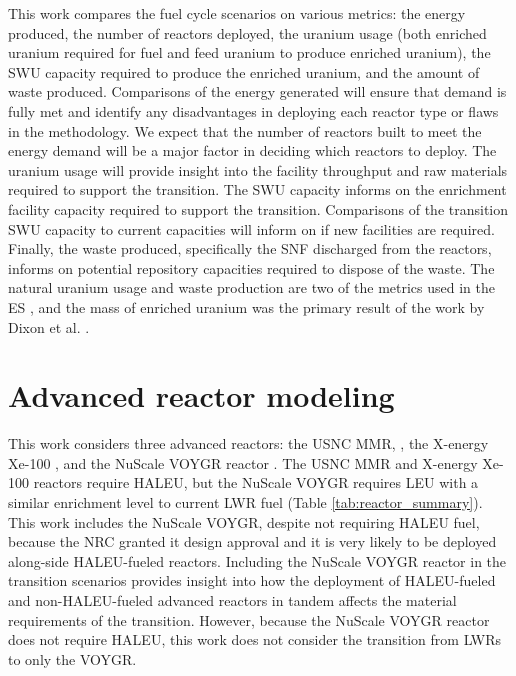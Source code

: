 This work compares the fuel cycle scenarios on various metrics: 
the energy produced, the number of reactors deployed, the 
uranium usage (both enriched uranium required for fuel and feed uranium 
to produce enriched uranium), 
the \gls{SWU} capacity required to produce the enriched uranium, and the 
amount of waste produced. Comparisons of the energy generated will ensure 
that demand is fully met and identify any disadvantages in deploying each 
reactor type or flaws in the methodology. We expect that the number of 
reactors built to meet the energy demand will be a major factor in deciding 
which reactors to deploy. The uranium usage will provide insight into 
the facility throughput and raw materials required to support the 
transition. The \gls{SWU} capacity informs on the enrichment facility 
capacity required to support the transition. Comparisons of the transition 
\gls{SWU} capacity to current capacities will inform on if new facilities 
are required. Finally, the waste produced, specifically the \gls{SNF} 
discharged from the reactors, informs on potential repository capacities 
required to dispose of the waste. The natural 
uranium usage and waste production are two of the metrics used in the \gls{ES} 
\cite{wigeland_nuclear_2014}, and the mass of enriched uranium was the 
primary result of the work by Dixon et al. \cite{dixon_estimated_2022}.

\section{Advanced reactor modeling} \label{sec:reactor_methods}
This work considers three advanced reactors: the \gls{USNC} \gls{MMR}, 
\cite{noauthor_usnc_2021}, the X-energy Xe-100 
\cite{mulder_overview_2021}, and 
the NuScale VOYGR reactor
\cite{nuscale_chapter_2020-1,reyes_nuscale_2021,reyes_correction_2022}. The 
\gls{USNC} \gls{MMR}
and X-energy Xe-100 reactors require \gls{HALEU}, but the NuScale VOYGR 
requires \gls{LEU} with a similar enrichment level to current \gls{LWR} fuel 
(Table \ref{tab:reactor_summary}). This work includes the NuScale VOYGR, 
despite not requiring \gls{HALEU} fuel, 
because the \gls{NRC} granted it design approval \cite{world_nuclear_news_nuscale_2021} 
and it is very likely to be 
deployed along-side \gls{HALEU}-fueled reactors. Including the NuScale 
VOYGR reactor in the transition scenarios provides insight into how the 
deployment of \gls{HALEU}-fueled and non-\gls{HALEU}-fueled advanced 
reactors in tandem 
affects the material requirements of the transition. However, because the 
NuScale VOYGR reactor does not require 
\gls{HALEU}, this work does not consider the transition from \glspl{LWR} 
to only the VOYGR.

